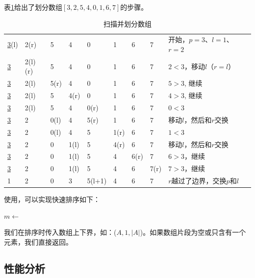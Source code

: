 \documentclass[b5paper]{ctexart}
\begin{document}
表\ref{tab:partition-steps}给出了划分数组$[3, 2, 5, 4, 0, 1, 6, 7]$的步骤。

\begin{table}[htbp]
\centering
\begin{tabular}{|llllllll|l|}
\hline
\underline{3}(l)  & 2(r) & 5 & 4 & 0 & 1 & 6 & 7 & 开始，$p = 3$、$l = 1$、$r = 2$ \\
\underline{3} & 2(l)(r) & 5 & 4 & 0 & 1 & 6 & 7 & $2 < 3$，移动$l$（$r=l$）\\
\underline{3} & 2(l) & 5(r) & 4 & 0 & 1 & 6 & 7 & $5 > 3$, 继续 \\
\underline{3} & 2(l) & 5 & 4(r) & 0 & 1 & 6 & 7 & $4 > 3$, 继续 \\
\underline{3} & 2(l) & 5 & 4 & 0(r) & 1 & 6 & 7 & $0 < 3$ \\
\underline{3} & 2 & 0(l) & 4 & 5(r) & 1 & 6 & 7 & 移动$l$，然后和$r$交换 \\
\underline{3} & 2 & 0(l) & 4 & 5 & 1(r) & 6 & 7 & $1 < 3$ \\
\underline{3} & 2 & 0 & 1(l) & 5 & 4(r) & 6 & 7 & 移动$l$，然后和$r$交换 \\
\underline{3} & 2 & 0 & 1(l) & 5 & 4 & 6(r) & 7 & $6 > 3$，继续 \\
\underline{3} & 2 & 0 & 1(l) & 5 & 4 & 6 & 7(r) & $7 > 3$，继续 \\
1 & 2 & 0 & 3 & 5(l+1) & 4 & 6 & 7 & $r$越过了边界，交换$p$和$l$ \\
\hline
\end{tabular}
\caption{扫描并划分数组} \label{tab:partition-steps}
\end{table}

使用，可以实现快速排序如下：

\begin{algorithmic}[1]
    \State $m \gets$ 
    \State {}
    \State {}
  \EndIf
\EndProcedure
\end{algorithmic}

我们在排序时传入数组上下界，如：($A, 1, |A|$)。如果数组片段为空或只含有一个元素，我们直接返回。

\begin{Exercise}
\end{Exercise}

\subsection{性能分析}
\end{document}
